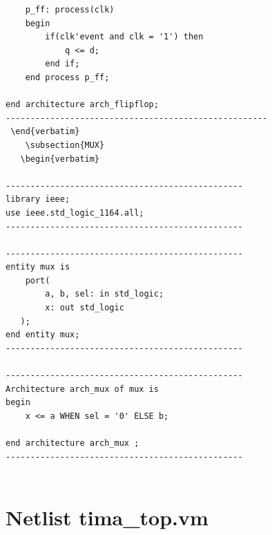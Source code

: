 \documentclass[a4paper,openright,12pt]{report}
\begin{document}
\begin{lstlisting}
    p_ff: process(clk)
    begin
        if(clk'event and clk = '1') then
            q <= d;
        end if;
    end process p_ff;

end architecture arch_flipflop;
-----------------------------------------------------
 \end{verbatim}
    \subsection{MUX}
   \begin{verbatim}

------------------------------------------------
library ieee;
use ieee.std_logic_1164.all;
------------------------------------------------

------------------------------------------------
entity mux is
    port(
        a, b, sel: in std_logic;
        x: out std_logic
   );
end entity mux;
------------------------------------------------

------------------------------------------------
Architecture arch_mux of mux is
begin
    x <= a WHEN sel = '0' ELSE b;

end architecture arch_mux ;
------------------------------------------------


 \end{lstlisting}
   
   


\section{ Netlist tima\_top.vm}
  
\end{document}
